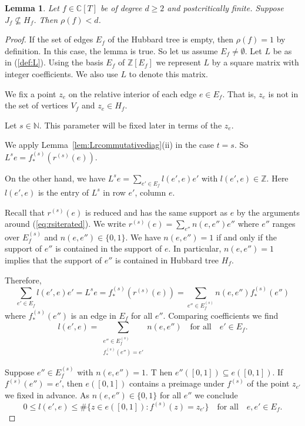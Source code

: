 \documentclass[12pt,oneside,a4]{amsart}
\newcommand{\IC}{\mathbb{C}}
\newcommand{\IN}{\mathbb{N}}
\newcommand{\IZ}{\mathbb{Z}}
\newcounter{maincounter}
\numberwithin{maincounter}{section}
\numberwithin{equation}{section}
\newtheorem{lemma}[maincounter]{Lemma}
\renewcommand{\subset}{\subseteq}
\begin{document}
\begin{lemma}
  \label{lem:JfnotsubsetHfrhoflessd}
  Let $f\in \IC[T]$ be of degree $d \ge 2$ and postcritically finite.
  Suppose $J_f\not\subset H_f$. Then $\rho(f)<d$.   
\end{lemma}
\begin{proof}
  If the set  of  edges $E_f$ of the Hubbard tree is empty, then
  $\rho(f)=1$ by definition. In this case, the lemma is true. So let us assume
  $E_f\not=\emptyset$. 
  Let $L$ be as in (\ref{def:L}). Using the basis $E_f$ of $\IZ[E_f]$ we
  represent $L$ by a square
  matrix with integer coefficients.
  We also use $L$ to denote this matrix. 
  
  We fix a point $z_e$ on the relative interior of
  each edge $e\in E_f$. That is, $z_e$ is not in the set of vertices
  $V_f$ and $z_e\in H_f$. 
  
  Let $s\in\IN$. This parameter will be fixed later in terms of the
  $z_e$.
  
  We apply Lemma~\ref{lem:Lrcommutativediag}(ii) in the case $t=s$.
  So $L^s e = f_*^{(s)}(r^{(s)}(e))$.

  On the other hand, we have $L^s e = \sum_{e' \in E_f} l(e',e) e'$
  with $l(e',e)\in\IZ$. Here $l(e',e)$ is the entry of
  $L^s$ in row $e'$, column $e$.

  Recall that $r^{(s)}(e)$ is reduced and has the same support as $e$
  by the arguments around (\ref{eq:rsiterated}). We write $r^{(s)}(e)
  = \sum_{e''} n(e,e'') e''$ where $e''$ ranges over $E_f^{(s)}$ and $n(e,e'')
  \in \{0,1\}$.
  We have $n(e,e'')=1$ if and only if
  the support of $e''$ is contained in the support of $e$.
  In particular,  $n(e,e'')=1$ implies that
  the support of $e''$   is contained in 
  Hubbard tree $H_f$.
  
  Therefore,
  \begin{equation*}
    \sum_{e'\in E_f} l(e',e) e' = L^s e =
    f_*^{(s)} (r^{(s)}(e)) = \sum_{e''\in E_f^{(s)}} n(e,e'')
    f_*^{(s)}(e'') 
  \end{equation*}
  where  $f_*^{(s)}(e'')$ is an edge in $E_f$ for all 
  $e''$. Comparing coefficients we find 
  \begin{equation*}
    l(e',e)  =  \sum_{\substack{ e''\in E_f^{(s)} \\
        f_*^{(s)}(e'')=e'}} n(e,e'')
    \quad\text{for all}\quad e'\in E_f. 
  \end{equation*}

  Suppose $e''\in E_f^{(s)}$ with $n(e,e'')=1$. T hen $e''([0,1])\subset
  e([0,1])$. 
  If $f^{(s)}(e'')=e'$, then $e([0,1])$ contains a
  preimage under $f^{(s)}$ of the point $z_{e'}$ we fixed in advance.
  As $n(e,e'')\in \{0,1\}$
  for all $e''$ we conclude
  \begin{equation*}
    0\le l(e',e)  \le \#\{ z\in e([0,1]) : f^{(s)}(z) = z_{e'} \}
    \quad\text{for all}\quad e,e'\in E_f. 
  \end{equation*}


\end{proof}
\end{document}
